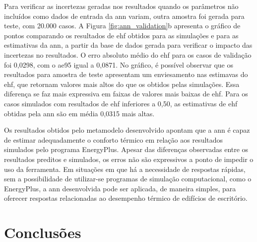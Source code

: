 \documentclass[brazil,hardcopy,openany]{ufscthesis} %
\begin{document}

Para verificar as incertezas geradas nos resultados quando os parâmetros não incluídos como dados de entrada da \acrshort{ann} variam, outra amostra foi gerada para teste, com 20.000 casos.
A Figura \ref{fig:ann_validation}b apresenta o gráfico de pontos comparando os resultados de \acrshort{ehf} obtidos para as simulações e para as estimativas da \acrshort{ann}, a partir da base de dados gerada para verificar o impacto das incertezas no resultados. O erro absoluto médio do \acrshort{ehf} para os casos de validação foi 0,0298, com o \acrshort{ae95} igual a 0,0871.
No gráfico, é possível observar que os resultados para amostra de teste apresentam um enviesamento nas estimavas do \acrshort{ehf}, que retornam valores mais altos do que os obtidos pelas simulações. Essa diferença se faz mais expressiva em faixas de valores mais baixas de \acrshort{ehf}. Para os casos simulados com resultados de \acrshort{ehf} inferiores a 0,50, as estimativas de \acrshort{ehf} obtidas pela \acrshort{ann} são em média 0,0315 mais altas.

Os resultados obtidos pelo metamodelo desenvolvido apontam que a \acrshort{ann} é capaz de estimar adequadamente o conforto térmico em relação aos resultados simulados pelo programa EnergyPlus. 
Apesar das diferenças observadas entre os resultados preditos e simulados, os erros não são expressivos a ponto de impedir o uso da ferramenta.
Em situações em que há a necessidade de respostas rápidas, sem a possibilidade de utilizar-se programas de simulação computacional, como o EnergyPlus, a \acrshort{ann} desenvolvida pode ser aplicada, de maneira simples, para oferecer respostas relacionadas ao desempenho térmico de edifícios de escritório.


\chapter{Conclusões}
\label{chapter:conclusoes}
	
\end{document}
